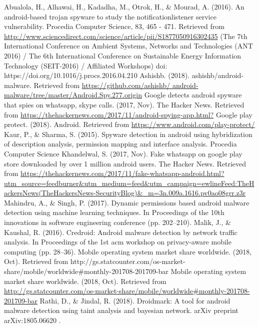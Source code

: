 \documentclass[conference]{IEEEtran}
\begin{document}
\begin{thebibliography}{00}
Abualola, H., Alhawai, H., Kadadha, M., Otrok, H., \& Mourad, A. (2016). An android-based trojan spyware to study the notificationlistener service vulnerability. Procedia Computer Science, 83, 465 - 471. Retrieved from {\selectfont \url{http://www.sciencedirect.com/science/article/pii/S1877050916302435}} (The 7th International Conference on Ambient Systems, Networks and Technologies (ANT 2016) / The 6th International Conference on Sustainable Energy Information Technology (SEIT-2016) / Affiliated Workshops) doi: https://doi.org/10.1016/j.procs.2016.04.210
Ashishb. (2018). ashishb/android-malware. Retrieved from {\selectfont \url{https://github.com/ashishb/ android-malware/tree/master/Android.Spy.277.origin}}
Google detects android spyware that spies on whatsapp, skype calls. (2017, Nov). The Hacker News. Retrieved from {\selectfont \url{https://thehackernews.com/2017/11/android-spying-app.html?}}
Google play protect. (2018). Android. Retrieved from {\selectfont \url{https://www.android.com/play-protect/}}
Kaur, P., \& Sharma, S. (2015). Spyware detection in android using hybridization of description analysis, permission mapping and interface analysis. Procedia Computer Science
Khandelwal, S. (2017, Nov). Fake whatsapp on google play store downloaded by over 1 million android users. The Hacker News. Retrieved from {\selectfont \url{https://thehackernews.com/2017/11/fake-whatsapp-android.html?utm\_source=feedburner\&utm\_medium=feed&utm\_campaign=ewlineFeed:TheHackersNews(TheHackersNews-SecurityBlog)\&\_m=3n.009a.1616.pv0ao08grr.z3r}}
Mahindru, A., \& Singh, P. (2017). Dynamic permissions based android malware detection using machine learning techniques. In Proceedings of the 10th innovations in software engineering conference (pp. 202–210).
Malik, J., \& Kaushal, R. (2016). Credroid: Android malware detection by network traffic analysis. In Proceedings of the 1st acm workshop on privacy-aware mobile computing (pp. 28–36).
Mobile operating system market share worldwide. (2018, Oct). Retrieved from http://gs.statcounter.com/os-market-share/mobile/worldwide#monthly-201708-201709-bar
Mobile operating system market share worldwide. (2018, Oct). Retrieved from {\selectfont \url{http://gs.statcounter.com/os-market-share/mobile/worldwide#monthly-201708-201709-bar}}
Rathi, D., \& Jindal, R. (2018). Droidmark: A tool for android malware detection using taint analysis and bayesian network. arXiv preprint arXiv:1805.06620 .

\end{thebibliography}
\end{document}
